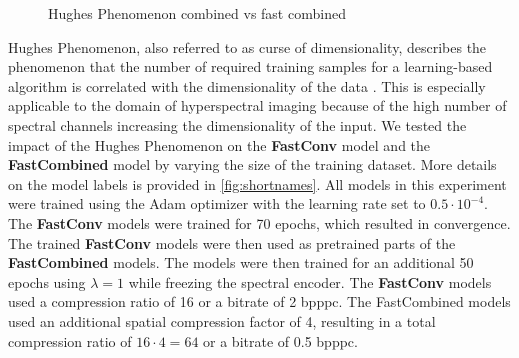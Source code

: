 \begin{figure}[!ht]
    \centering
{}\datatable
{}
\caption{Hughes Phenomenon combined vs fast combined}
\label{fig:hughesangle}
\end{figure}

Hughes Phenomenon, also referred to as curse of dimensionality, describes the phenomenon that the number of required training samples for a learning-based algorithm is correlated with the dimensionality of the data \citep{hughes_mean_1968}. This is especially applicable to the domain of hyperspectral imaging because of the high number of spectral channels increasing the dimensionality of the input. We tested the impact of the Hughes Phenomenon on the \textbf{FastConv} model and the \textbf{FastCombined} model by varying the size of the training dataset. More details on the model labels is provided in \autoref{fig:shortnames}. All models in this experiment were trained using the Adam optimizer with the learning rate set to $0.5\cdot 10^{-4}$. The \textbf{FastConv} models were trained for 70 epochs, which resulted in convergence.
The trained \textbf{FastConv} models were then used as pretrained parts of the \textbf{FastCombined} models. The models were then trained for an additional 50 epochs using $\lambda=1$ while freezing the spectral encoder. 
The \textbf{FastConv} models used a compression ratio of 16 or a bitrate of 2 \ac{bpppc}. The FastCombined models used an additional spatial compression factor of 4, resulting in a total compression ratio of $16 \cdot 4=64$ or a bitrate of 0.5 \ac{bpppc}.

